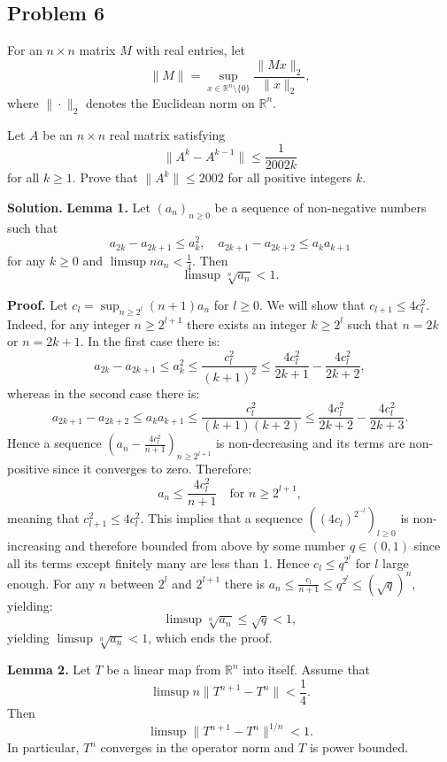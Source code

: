 \documentclass{article}
\begin{document}
\subsection*{Problem 6}
For an \( n \times n \) matrix \( M \) with real entries, let
\[
\|M\| = \sup_{x \in \mathbb{R}^n \setminus \{0\}} \frac{\|Mx\|_2}{\|x\|_2},
\]
where \( \|\cdot\|_2 \) denotes the Euclidean norm on \( \mathbb{R}^n \).

Let $A$ be an $n \times n$ real matrix satisfying
\[
\|A^k - A^{k-1}\| \leq \frac{1}{2002k}
\]
for all $k \geq 1$. Prove that $\|A^k\| \leq 2002$ for all positive integers $k$.

\textbf{Solution.}
\textbf{Lemma 1.}
Let \((a_n)_{n \geq 0}\) be a sequence of non-negative numbers such that
\[
a_{2k} - a_{2k+1} \leq a_k^2, \quad a_{2k+1} - a_{2k+2} \leq a_k a_{k+1}
\]
for any \(k \geq 0\) and \(\limsup n a_n < \frac{1}{4}\).
Then
\[
\limsup \sqrt[n]{a_n} < 1.
\]

\textbf{Proof.}
Let \(c_l = \sup_{n \geq 2^l} (n+1) a_n\) for \(l \geq 0\).
We will show that \(c_{l+1} \leq 4 c_l^2\).
Indeed, for any integer \(n \geq 2^{l+1}\) there exists an integer \(k \geq 2^l\) such that \(n = 2k\) or \(n = 2k+1\).
In the first case there is:
\[
a_{2k} - a_{2k+1} \leq a_k^2 \leq \frac{c_l^2}{(k+1)^2} \leq \frac{4 c_l^2}{2k+1} - \frac{4 c_l^2}{2k+2},
\]
whereas in the second case there is:
\[
a_{2k+1} - a_{2k+2} \leq a_k a_{k+1} \leq \frac{c_l^2}{(k+1)(k+2)} \leq \frac{4 c_l^2}{2k+2} - \frac{4 c_l^2}{2k+3}.
\]
Hence a sequence \(\left(a_n - \frac{4 c_l^2}{n+1}\right)_{n \geq 2^{l+1}}\) is non-decreasing and its terms are non-positive since it converges to zero.
Therefore:
\[
a_n \leq \frac{4 c_l^2}{n+1} \quad \text{for } n \geq 2^{l+1},
\]
meaning that \(c_{l+1}^2 \leq 4 c_l^2\).
This implies that a sequence \(\left((4 c_l)^{2^{-l}}\right)_{l \geq 0}\) is non-increasing and therefore bounded from above by some number \(q \in (0,1)\) since all its terms except finitely many are less than 1.
Hence \(c_l \leq q^{2^l}\) for \(l\) large enough.
For any \(n\) between \(2^l\) and \(2^{l+1}\) there is \(a_n \leq \frac{c_l}{n+1} \leq q^{2^l} \leq (\sqrt{q})^n\), yielding:
\[
\limsup \sqrt[n]{a_n} \leq \sqrt{q} < 1,
\]
yielding \(\limsup \sqrt[n]{a_n} < 1\), which ends the proof.

\textbf{Lemma 2.}
Let \( T \) be a linear map from \( \mathbb{R}^n \) into itself. Assume that
\[
\limsup n \|T^{n+1} - T^n\| < \frac{1}{4}.
\]
Then
\[
\limsup \|T^{n+1} - T^n\|^{1/n} < 1.
\]
In particular, \( T^n \) converges in the operator norm and \( T \) is power bounded.
\end{document}

